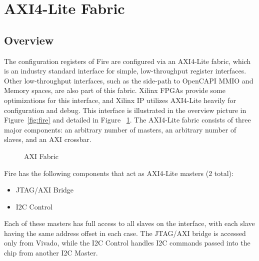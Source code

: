 \graphicspath{ {images/} }

\section{AXI4-Lite Fabric} \label{section_axi}

\subsection{Overview}
The configuration registers of Fire are configured via an AXI4-Lite
fabric, which is an industry standard interface for simple,
low-throughput register interfaces. Other low-throughput interfaces,
such as the side-path to OpenCAPI MMIO and Memory spaces, are also
part of this fabric. Xilinx FPGAs provide some optimizations for this
interface, and Xilinx IP utilizes AXI4-Lite heavily for configuration
and debug. This interface is illustrated in the overview picture in
Figure~\ref{fig:fire} and detailed in Figure ~\ref{fig:fire_axi}. The
AXI4-Lite fabric consists of three major components: an arbitrary
number of masters, an arbitrary number of slaves, and an AXI crossbar.

\begin{figure}[h]
  \begin{center}
    
  \end{center}
  \caption[AXI Fabric]{\label{fig:fire_axi}AXI Fabric
  }
\end{figure}

Fire has the following components that act as AXI4-Lite masters (2 total):
\begin{itemize}
  \item JTAG/AXI Bridge
  \item I2C Control
\end{itemize}
Each of these masters has full access to all slaves on the interface,
with each slave having the same address offset in each case. The
JTAG/AXI bridge is accessed only from Vivado, while the I2C Control
handles I2C commands passed into the chip from another I2C Master.

